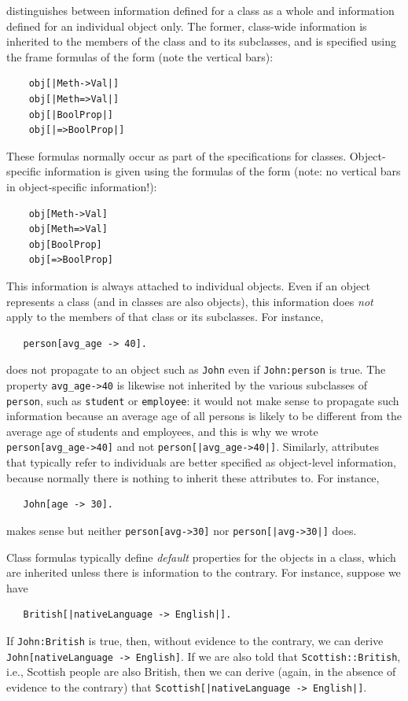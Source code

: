 \documentclass[11pt]{article}
\newcommand{\ERGO}{\mbox{\smaller{\ensuremath{\cal{E}}\smaller{{\sc{RGO}}}}}\xspace}
\newcommand{\FLSYSTEM}{\ERGO}
\begin{document}
\FLSYSTEM distinguishes between information defined for a class as a whole
and information defined for an individual object only.
The former, class-wide information is inherited to the members of the class and to its
subclasses, and is specified using the frame formulas of the form
(note the vertical bars):
\begin{verbatim}
    obj[|Meth->Val|]
    obj[|Meth=>Val|]
    obj[|BoolProp|]
    obj[|=>BoolProp|]
\end{verbatim}
These formulas normally occur as part of the specifications for classes.
Object-specific information is given using the formulas of
the form (note: no vertical bars in object-specific information!):
\begin{verbatim}
    obj[Meth->Val]
    obj[Meth=>Val]
    obj[BoolProp]
    obj[=>BoolProp]
\end{verbatim}
This information is always attached to individual
objects. Even if an object represents a class (and in \FLSYSTEM classes are
also objects), this information
does \emph{not} apply to the members of that class or its subclasses. For
instance,
\begin{verbatim}
   person[avg_age -> 40].  
\end{verbatim}
does not propagate to an object such as \texttt{John} even if
\texttt{John:person}  is true. The property \texttt{avg\_age->40} 
is likewise not inherited by the various subclasses of
\texttt{person}, such as \texttt{student} or \texttt{employee}: it would
not make sense to propagate such information because an average age of all
persons is likely to be different from the average age of students and
employees, and this is why we wrote \texttt{person[avg\_age->40]}   
and not \texttt{person[|avg\_age->40|]}.
Similarly, attributes that typically refer to individuals are better
specified as object-level information, because normally there is nothing to
inherit these attributes to. For instance,
\begin{verbatim}
   John[age -> 30].  
\end{verbatim}
makes sense but neither \texttt{person[avg->30]} nor
\texttt{person[|avg->30|]} does.

Class formulas typically define \emph{default} properties 
for the objects in a class, which are inherited unless there is information
to the contrary. For instance, suppose we have
\begin{verbatim}
   British[|nativeLanguage -> English|].  
\end{verbatim}
If {\tt John:British} is true, then, without evidence to the contrary,
we can derive {\tt
  John[nativeLanguage -> English]}.
If we are also told that {\tt Scottish::British}, i.e., Scottish
  people are also British, then we can derive (again, in the absence of 
  evidence to the contrary)
  that {\tt Scottish[|nativeLanguage -> English|]}.
  
\end{document}
